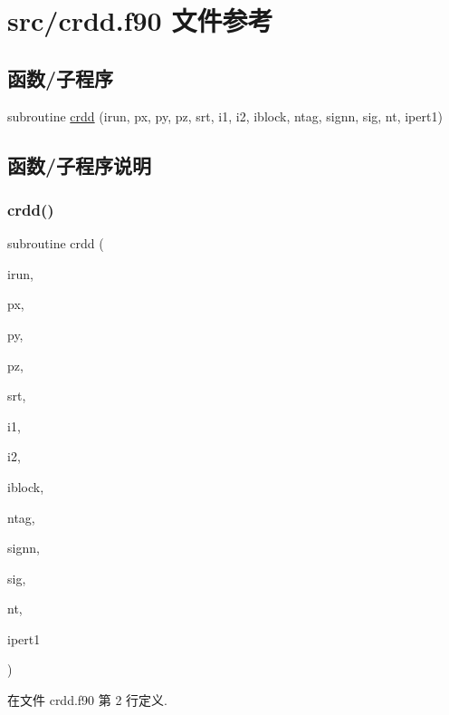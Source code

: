 \hypertarget{crdd_8f90}{}\section{src/crdd.f90 文件参考}
\label{crdd_8f90}
\subsection*{函数/子程序}
\begin{DoxyCompactItemize}
\item 
subroutine \mbox{\hyperlink{crdd_8f90_a5f08f298066534487989cbf4a179e7fe}{crdd}} (irun, px, py, pz, srt, i1, i2, iblock, ntag, signn, sig, nt, ipert1)
\end{DoxyCompactItemize}


\subsection{函数/子程序说明}
\mbox{\label{crdd_8f90_a5f08f298066534487989cbf4a179e7fe}} 
\subsubsection{\texorpdfstring{crdd()}{crdd()}}
{\footnotesize\ttfamily subroutine crdd (\begin{DoxyParamCaption}\item[{}]{irun,  }\item[{}]{px,  }\item[{}]{py,  }\item[{}]{pz,  }\item[{}]{srt,  }\item[{}]{i1,  }\item[{}]{i2,  }\item[{}]{iblock,  }\item[{}]{ntag,  }\item[{}]{signn,  }\item[{}]{sig,  }\item[{}]{nt,  }\item[{}]{ipert1 }\end{DoxyParamCaption})}



在文件 crdd.\+f90 第 2 行定义.

